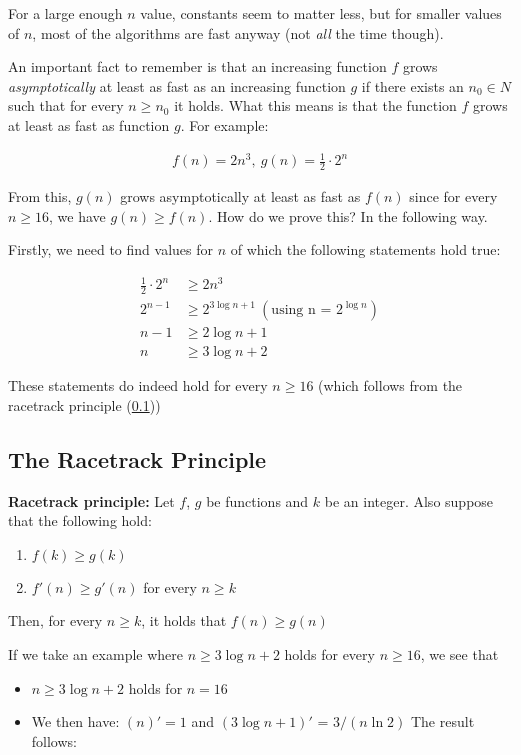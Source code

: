 \documentclass[11pt,a4paper,titlepage,dvipsnames,cmyk]{scrartcl}
\begin{document}
For a large enough $n$ value, constants seem to matter less, but for
smaller values of $n$, most of the algorithms are fast anyway (not
\textit{all} the time though).

An important fact to remember is that an increasing function $f$ grows 
\textit{asymptotically} at least as fast as an increasing function $g$ if
there exists an $n_0 \in N$ such that for every $n \ge n_0$ it
holds. What this means is that the function $f$ grows at least as fast as
function $g$. For example:

\begin{align*}
    f(n) = 2n^3, \ g(n) = \frac{1}{2} \cdot 2^n
\end{align*}

From this, $g(n)$ grows asymptotically at least as fast as $f(n)$ since
for every $n \ge 16$, we have $g(n) \ge f(n)$. How do we prove this? In
the following way.

Firstly, we need to find values for $n$ of which the following statements
hold true:

\begin{align*}
    \frac{1}{2} \cdot 2^n &\ge 2n^3 \\
    2^{n-1} &\ge 2^{3 \log n+1} \ ( \text{using n = } 2^{\log n} ) \\
    n-1 &\ge 2 \log n+1 \\
    n &\ge 3 \log n+2
\end{align*}

These statements do indeed hold for every $n \ge 16$ (which follows from
the racetrack principle (\ref{sub:racetrack}))

\subsection{The Racetrack Principle}%
\label{sub:racetrack}
\begin{tcolorbox}
        \textbf{Racetrack principle:} Let $f$, $g$ be functions and $k$ be
        an integer. Also suppose that the following hold:
        \begin{enumerate}
            \item $f(k) \ge g(k)$
            \item $f'(n) \ge g'(n)$ for every $n\ge k$
        \end{enumerate}
        
        Then, for every $n \ge k$, it holds that $f(n) \ge g(n)$
\end{tcolorbox}

If we take an example where $n \ge 3 \log n + 2$ holds for every $n \ge
16$, we see that
\begin{itemize}
    \item $n \ge 3 \log n +2$ holds for $n = 16$
    \item We then have: $(n)' = 1$ and $(3 \log n + 1)'$ = $3/(n \ln 2)$
        The result follows:
\end{itemize}
\end{document}

